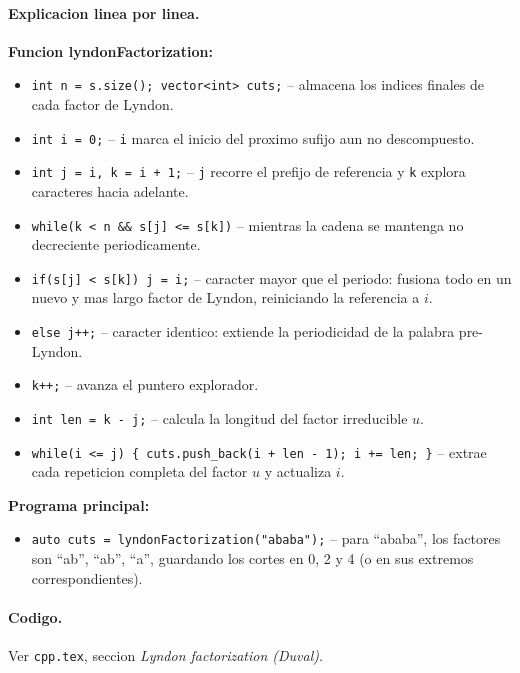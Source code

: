 \paragraph{Explicacion linea por linea.}
\textbf{Funcion lyndonFactorization:}
\begin{itemize}\setlength\itemsep{0pt}
	\item \verb|int n = s.size(); vector<int> cuts;| -- almacena los indices finales de cada factor de Lyndon.
	\item \verb|int i = 0;| -- \verb|i| marca el inicio del proximo sufijo aun no descompuesto.
	\item \verb|int j = i, k = i + 1;| -- \verb|j| recorre el prefijo de referencia y \verb|k| explora caracteres hacia adelante.
	\item \verb|while(k < n && s[j] <= s[k])| -- mientras la cadena se mantenga no decreciente periodicamente.
	\item \verb|if(s[j] < s[k]) j = i;| -- caracter mayor que el periodo: fusiona todo en un nuevo y mas largo factor de Lyndon, reiniciando la referencia a $i$.
	\item \verb|else j++;| -- caracter identico: extiende la periodicidad de la palabra pre-Lyndon.
	\item \verb|k++;| -- avanza el puntero explorador.
	\item \verb|int len = k - j;| -- calcula la longitud del factor irreducible $u$.
	\item \verb|while(i <= j) { cuts.push_back(i + len - 1); i += len; }| -- extrae cada repeticion completa del factor $u$ y actualiza $i$.
\end{itemize}
\textbf{Programa principal:}
\begin{itemize}\setlength\itemsep{0pt}
	\item \verb|auto cuts = lyndonFactorization("ababa");| -- para ``ababa'', los factores son ``ab'', ``ab'', ``a'', guardando los cortes en 0, 2 y 4 (o en sus extremos correspondientes).
\end{itemize}

\paragraph{Codigo.}
Ver \texttt{cpp.tex}, seccion \textit{Lyndon factorization (Duval)}.

\vspace{0.5em}
